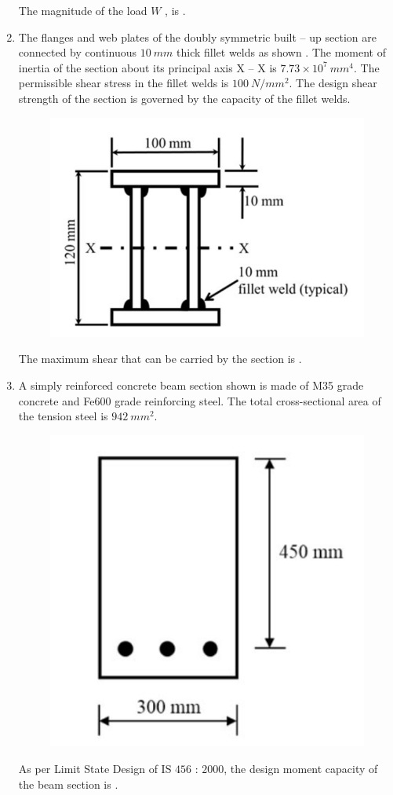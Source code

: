 \documentclass[journal]{IEEEtran}
\begin{document}
\begin{enumerate}
The magnitude of the load $W$ , is \underline{\hspace{2cm}}. \hfill {}

\item The flanges and web plates of the doubly symmetric built -- up section are connected by continuous $10 \ mm$ thick fillet welds as shown . The moment of inertia of the section about its principal axis X -- X is $7.73 \times 10^7 \ mm^4$. The permissible shear stress in the fillet welds is $100 \ N/mm^2$. The design shear strength of the section is governed by the capacity of the fillet welds.  

\begin{figure}[H]
    \centering
    \includegraphics[width=0.3\columnwidth]{figs/Q52.png} 
    \caption{}
    \label{fig:placeholder}
\end{figure}

The maximum shear  that can be carried by the section is \underline{\hspace{2cm}}. \hfill {}

\item A simply reinforced concrete beam section shown  is made of M35 grade concrete and Fe600 grade reinforcing steel. The total cross-sectional area of the tension steel is $942 \ mm^2$.  

\begin{figure}[H]
    \centering
    \includegraphics[width=0.3\columnwidth]{figs/Q53.png} 
    \caption{}
    \label{fig:placeholder}
\end{figure}

As per Limit State Design of IS $456$ : $2000$, the design moment capacity  of the beam section is \underline{\hspace{2cm}}. \hfill {}


\end{enumerate}
\end{document}
